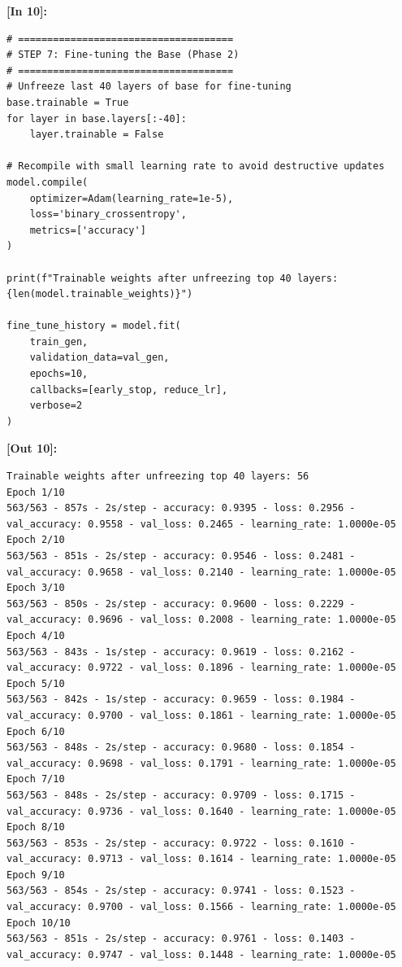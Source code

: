 \vspace{0.6em}
\noindent\textbf{\small [In 10]:}
\begin{lstlisting}[style=pycode]
# =====================================
# STEP 7: Fine-tuning the Base (Phase 2)
# =====================================
# Unfreeze last 40 layers of base for fine-tuning
base.trainable = True
for layer in base.layers[:-40]:
    layer.trainable = False

# Recompile with small learning rate to avoid destructive updates
model.compile(
    optimizer=Adam(learning_rate=1e-5),
    loss='binary_crossentropy',
    metrics=['accuracy']
)

print(f"Trainable weights after unfreezing top 40 layers: {len(model.trainable_weights)}")

fine_tune_history = model.fit(
    train_gen,
    validation_data=val_gen,
    epochs=10,
    callbacks=[early_stop, reduce_lr],
    verbose=2
)\end{lstlisting}
\noindent\textbf{\small [Out 10]:}
\begin{lstlisting}[style=output]
Trainable weights after unfreezing top 40 layers: 56
Epoch 1/10
563/563 - 857s - 2s/step - accuracy: 0.9395 - loss: 0.2956 - val_accuracy: 0.9558 - val_loss: 0.2465 - learning_rate: 1.0000e-05
Epoch 2/10
563/563 - 851s - 2s/step - accuracy: 0.9546 - loss: 0.2481 - val_accuracy: 0.9658 - val_loss: 0.2140 - learning_rate: 1.0000e-05
Epoch 3/10
563/563 - 850s - 2s/step - accuracy: 0.9600 - loss: 0.2229 - val_accuracy: 0.9696 - val_loss: 0.2008 - learning_rate: 1.0000e-05
Epoch 4/10
563/563 - 843s - 1s/step - accuracy: 0.9619 - loss: 0.2162 - val_accuracy: 0.9722 - val_loss: 0.1896 - learning_rate: 1.0000e-05
Epoch 5/10
563/563 - 842s - 1s/step - accuracy: 0.9659 - loss: 0.1984 - val_accuracy: 0.9700 - val_loss: 0.1861 - learning_rate: 1.0000e-05
Epoch 6/10
563/563 - 848s - 2s/step - accuracy: 0.9680 - loss: 0.1854 - val_accuracy: 0.9698 - val_loss: 0.1791 - learning_rate: 1.0000e-05
Epoch 7/10
563/563 - 848s - 2s/step - accuracy: 0.9709 - loss: 0.1715 - val_accuracy: 0.9736 - val_loss: 0.1640 - learning_rate: 1.0000e-05
Epoch 8/10
563/563 - 853s - 2s/step - accuracy: 0.9722 - loss: 0.1610 - val_accuracy: 0.9713 - val_loss: 0.1614 - learning_rate: 1.0000e-05
Epoch 9/10
563/563 - 854s - 2s/step - accuracy: 0.9741 - loss: 0.1523 - val_accuracy: 0.9700 - val_loss: 0.1566 - learning_rate: 1.0000e-05
Epoch 10/10
563/563 - 851s - 2s/step - accuracy: 0.9761 - loss: 0.1403 - val_accuracy: 0.9747 - val_loss: 0.1448 - learning_rate: 1.0000e-05
\end{lstlisting}

